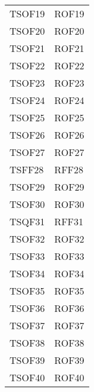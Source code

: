 \documentclass[../PianoDiQualifica_v3.0.0.tex]{subfiles}
\begin{document}
\begin{longtable}[c] { >{\centering\arraybackslash}p{3cm} >{\centering\arraybackslash}p{3cm}}
			\midrule
			\addlinespace[0.3em]
			TSOF19 & ROF19 \\
			\addlinespace[0.3em]
			\midrule
			\addlinespace[0.3em]
			TSOF20 & ROF20 \\
			\addlinespace[0.3em]
			\midrule
			\addlinespace[0.3em]
			TSOF21 & ROF21 \\
			\addlinespace[0.3em]
			\midrule
			\addlinespace[0.3em]
			TSOF22 & ROF22 \\
			\addlinespace[0.3em]
			\midrule
			\addlinespace[0.3em]
			TSOF23 & ROF23 \\
			\addlinespace[0.3em]
			\midrule
			\addlinespace[0.3em]
			TSOF24 & ROF24 \\
			\addlinespace[0.3em]
			\midrule
			\addlinespace[0.3em]
			TSOF25 & ROF25 \\
			\addlinespace[0.3em]
			\midrule
			\addlinespace[0.3em]
			TSOF26 & ROF26 \\
			\addlinespace[0.3em]
			\midrule
			\addlinespace[0.3em]
			TSOF27 & ROF27 \\
			\addlinespace[0.3em]
			\midrule
			\addlinespace[0.3em]
			TSFF28 & RFF28 \\
			\addlinespace[0.3em]
			\midrule
			\addlinespace[0.3em]
			TSOF29 & ROF29 \\
			\addlinespace[0.3em]
			\midrule
			\addlinespace[0.3em]
			TSOF30 & ROF30 \\
			\addlinespace[0.3em]
			\midrule
			\addlinespace[0.3em]
			TSQF31 & RFF31 \\
			\addlinespace[0.3em]
			\midrule
			\addlinespace[0.3em]
			TSOF32 & ROF32 \\
			\addlinespace[0.3em]
			\midrule
			\addlinespace[0.3em]
			TSOF33 & ROF33 \\
			\addlinespace[0.3em]
			\midrule
			\addlinespace[0.3em]
			TSOF34 & ROF34 \\
			\addlinespace[0.3em]
			\midrule
			\addlinespace[0.3em]
			TSOF35 & ROF35 \\
			\addlinespace[0.3em]
			\midrule
			\addlinespace[0.3em]
			TSOF36 & ROF36 \\
			\addlinespace[0.3em]
			\midrule
			\addlinespace[0.3em]
			TSOF37 & ROF37 \\
			\addlinespace[0.3em]
			\midrule
			\addlinespace[0.3em]
			TSOF38 & ROF38 \\
			\addlinespace[0.3em]
			\midrule
			\addlinespace[0.3em]
			TSOF39 & ROF39 \\
			\addlinespace[0.3em]
			\midrule
			\addlinespace[0.3em]
			TSOF40 & ROF40 \\

\end{longtable}
\end{document}

